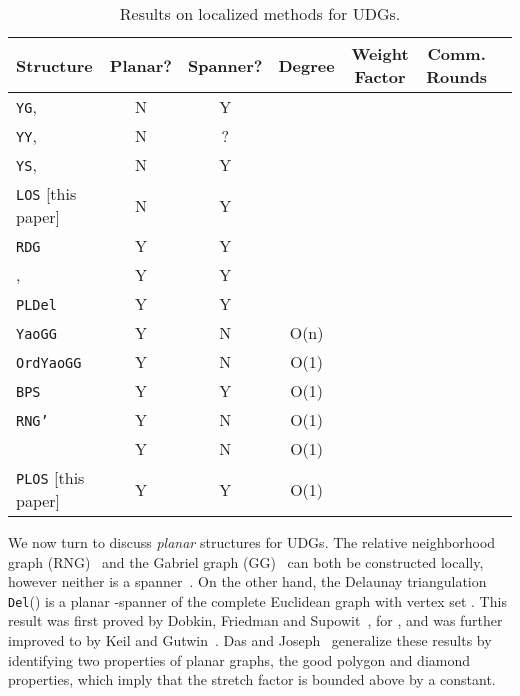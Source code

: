 \documentclass{llncs}
\newcommand{\bps}{{\tt BPS}}
\newcommand{\pldel}{{\tt PLDel}}
\newcommand{\del}{{\tt Del}}
\begin{document}
\begin{table}[htpb]
\begin{center}
\begin{tabular}{|l|c|c|c|c|c|c|} \hline
Structure & Planar? & Spanner? & Degree & Weight Factor & Comm. Rounds \\ \hline
{\tt YG}, ~\cite{Yao82} & N & Y &  &   &  \\ \hline
{\tt YY}, ~\cite{li02sparse} & N & ? &  &  &  \\ \hline
{\tt YS}, ~\cite{WangLi03} & N & Y &  &  &  \\ \hline
\rowcolor{cyan}
{\tt LOS} [this paper] & N & Y &  &  &  \\ \hline
{\tt RDG}~\cite{GGH+01} & Y & Y &  &   &  \\ \hline
, ~\cite{LCW02} & Y & Y &  &  &  \\ \hline
\pldel~\cite{LCW02,AraujoR04} & Y & Y &  &  &  \\ \hline
{\tt YaoGG}~\cite{li02sparse}& Y & N & O(n) &  &  \\ \hline
{\tt OrdYaoGG}~\cite{SWLF04}& Y & N & O(1) &  &  \\ \hline
\bps~\cite{WangLi03,LiWang04}& Y & Y & O(1) &  &  \\ \hline
{\tt RNG'}~\cite{li-localmst-03}& Y & N & O(1) &  &  \\ \hline
~\cite{lws-ieee-04}& Y & N & O(1) &  &  \\ \hline
\rowcolor{cyan}
{\tt PLOS} [this paper] & Y & Y & O(1) &  &  \\ \hline
\end{tabular}
\end{center}
\caption[]{Results on localized methods for UDGs.}
\label{tab:results}
\end{table}

We now turn to discuss \emph{planar} structures for UDGs.
The relative neighborhood graph (RNG)~\cite{god-pr-80}
and the Gabriel graph (GG)~\cite{gg-geo-69} can both be constructed locally,
however neither is a spanner~\cite{BDEK06}.
On the other hand, the Delaunay triangulation \del() is a planar -spanner
of the complete Euclidean graph with vertex set .
This result was first proved by Dobkin, Friedman and Supowit~\cite{dfs-dg-90},
for , and was further improved
to  by Keil and Gutwin~\cite{kg-dt-92}.
Das and Joseph~\cite{dj-tcg-89} generalize these results by identifying
two properties of planar graphs, the good polygon and diamond properties,
which imply that the stretch factor is bounded above by a constant.
\end{document}
